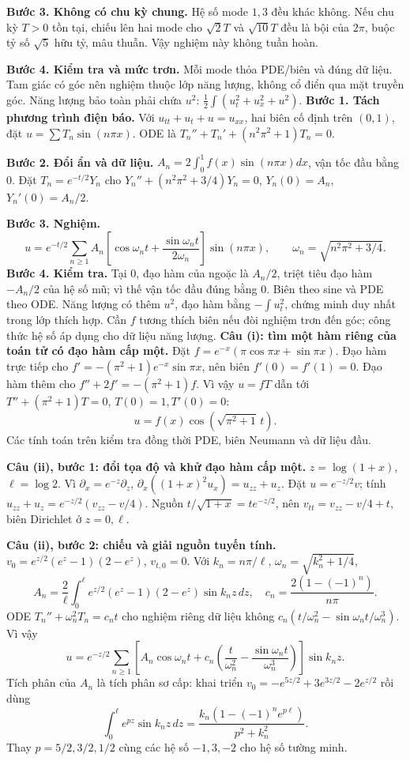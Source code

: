 \textbf{Bước 3. Không có chu kỳ chung.} Hệ số mode $1,3$ đều khác không. Nếu chu kỳ $T>0$ tồn tại, chiếu lên hai mode cho $\sqrt2T$ và $\sqrt{10}T$ đều là bội của $2\pi$, buộc tỷ số $\sqrt5$ hữu tỷ, mâu thuẫn. Vậy nghiệm này không tuần hoàn.

\textbf{Bước 4. Kiểm tra và mức trơn.} Mỗi mode thỏa PDE/biên và đúng dữ liệu. Tam giác có góc nên nghiệm thuộc lớp năng lượng, không cổ điển qua mặt truyền góc. Năng lượng bảo toàn phải chứa $u^2$: $\frac12\int(u_t^2+u_x^2+u^2)$.
\textbf{Bước 1. Tách phương trình điện báo.} Với $u_{tt}+u_t+u=u_{xx}$, hai biên cố định trên $(0,1)$, đặt $u=\sum T_n\sin(n\pi x)$. ODE là $T_n''+T_n'+(n^2\pi^2+1)T_n=0$.

\textbf{Bước 2. Đổi ẩn và dữ liệu.} $A_n=2\int_0^1f(x)\sin(n\pi x)dx$, vận tốc đầu bằng $0$. Đặt $T_n=e^{-t/2}Y_n$ cho $Y_n''+(n^2\pi^2+3/4)Y_n=0$, $Y_n(0)=A_n$, $Y_n'(0)=A_n/2$.

\textbf{Bước 3. Nghiệm.}
\[u=e^{-t/2}\sum_{n\ge1}A_n\left[\cos\omega_nt+\frac{\sin\omega_nt}{2\omega_n}\right]\sin(n\pi x),\qquad\omega_n=\sqrt{n^2\pi^2+3/4}.\]
\textbf{Bước 4. Kiểm tra.} Tại $0$, đạo hàm của ngoặc là $A_n/2$, triệt tiêu đạo hàm $-A_n/2$ của hệ số mũ; vì thế vận tốc đầu đúng bằng $0$. Biên theo sine và PDE theo ODE. Năng lượng có thêm $u^2$, đạo hàm bằng $-\int u_t^2$, chứng minh duy nhất trong lớp thích hợp. Cần $f$ tương thích biên nếu đòi nghiệm trơn đến góc; công thức hệ số áp dụng cho dữ liệu năng lượng.
\textbf{Câu (i): tìm một hàm riêng của toán tử có đạo hàm cấp một.} Đặt $f=e^{-x}(\pi\cos\pi x+\sin\pi x)$. Đạo hàm trực tiếp cho $f'=-(\pi^2+1)e^{-x}\sin\pi x$, nên biên $f'(0)=f'(1)=0$. Đạo hàm thêm cho $f''+2f'=-(\pi^2+1)f$. Vì vậy $u=fT$ dẫn tới $T''+(\pi^2+1)T=0$, $T(0)=1,T'(0)=0$:
\[u=f(x)\cos(\sqrt{\pi^2+1}\,t).\]
Các tính toán trên kiểm tra đồng thời PDE, biên Neumann và dữ liệu đầu.

\textbf{Câu (ii), bước 1: đổi tọa độ và khử đạo hàm cấp một.} $z=\log(1+x)$, $\ell=\log2$. Vì $\partial_x=e^{-z}\partial_z$, $\partial_x((1+x)^2u_x)=u_{zz}+u_z$. Đặt $u=e^{-z/2}v$; tính $u_{zz}+u_z=e^{-z/2}(v_{zz}-v/4)$. Nguồn $t/\sqrt{1+x}=te^{-z/2}$, nên $v_{tt}=v_{zz}-v/4+t$, biên Dirichlet ở $z=0,\ell$.

\textbf{Câu (ii), bước 2: chiếu và giải nguồn tuyến tính.} $v_0=e^{z/2}(e^z-1)(2-e^z)$, $v_{t,0}=0$. Với $k_n=n\pi/\ell$, $\omega_n=\sqrt{k_n^2+1/4}$,
\[A_n=\frac2\ell\int_0^\ell e^{z/2}(e^z-1)(2-e^z)\sin k_nz\,dz,\quad c_n=\frac{2(1-(-1)^n)}{n\pi}.\]
ODE $T_n''+\omega_n^2T_n=c_nt$ cho nghiệm riêng dữ liệu không $c_n(t/\omega_n^2-\sin\omega_nt/\omega_n^3)$. Vì vậy
\[u=e^{-z/2}\sum_{n\ge1}\left[A_n\cos\omega_nt+c_n\left(\frac t{\omega_n^2}-\frac{\sin\omega_nt}{\omega_n^3}\right)\right]\sin k_nz.\]
Tích phân của $A_n$ là tích phân sơ cấp: khai triển $v_0=-e^{5z/2}+3e^{3z/2}-2e^{z/2}$ rồi dùng
\[\int_0^\ell e^{pz}\sin k_nz\,dz=\frac{k_n(1-(-1)^ne^{p\ell})}{p^2+k_n^2}.\]
Thay $p=5/2,3/2,1/2$ cùng các hệ số $-1,3,-2$ cho hệ số tường minh.

